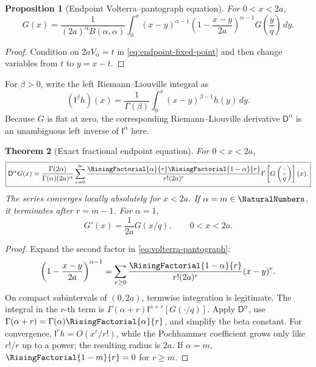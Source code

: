 \documentclass[11pt]{article}
\newtheorem{theorem}{Theorem}[section]
\newtheorem{proposition}[theorem]{Proposition}
\theoremstyle{definition}
\theoremstyle{remark}
\newcommand{\Iop}{\mathsf{I}}
\newcommand{\Dop}{\mathsf{D}}
\begin{document}
\begin{proposition}[Endpoint Volterra--pantograph equation]
\label{prop:volterra}
For \(0<x<2a\),
\begin{equation}
 G(x)=\frac1{(2a)^\alpha B(\alpha,\alpha)}
 \int_0^x(x-y)^{\alpha-1}
 \left(1-\frac{x-y}{2a}\right)^{\alpha-1}
 G\left(\frac yq\right)\,dy.
 \label{eq:volterra-pantograph}
\end{equation}
\end{proposition}

\begin{proof}
Condition on \(2aV_\alpha=t\) in \eqref{eq:endpoint-fixed-point} and then
change variables from \(t\) to \(y=x-t\).
\end{proof}

For \(\beta>0\), write the left Riemann--Liouville integral as
\begin{equation}
 (\Iop^\beta h)(x)
 =\frac1{\Gamma(\beta)}\int_0^x(x-y)^{\beta-1}h(y)\,dy.
 \label{eq:RL-integral}
\end{equation}
Because \(G\) is flat at zero, the corresponding Riemann--Liouville derivative
\(\Dop^\alpha\) is an unambiguous left inverse of \(\Iop^\alpha\) here.

\begin{theorem}[Exact fractional endpoint equation]
\label{thm:fractional-pantograph}
For \(0<x<2a\),
\begin{equation}
\boxed{
 \Dop^\alpha G(x)
 =\frac{\Gamma(2\alpha)}{\Gamma(\alpha)(2a)^\alpha}
 \sum_{r=0}^{\infty}
 \frac{\RisingFactorial{\alpha}{r}\RisingFactorial{1-\alpha}{r}}
 {r!(2a)^r}
 \Iop^r\!\left[G\left(\frac{\cdot}{q}\right)\right](x).}
 \label{eq:fractional-endpoint-equation}
\end{equation}
The series converges locally absolutely for \(x<2a\).  If
\(\alpha=m\in\NaturalNumbers\), it terminates after \(r=m-1\).  For \(\alpha=1\),
\begin{equation}
 G'(x)=\frac1{2a}G(x/q),\qquad 0<x<2a.
 \label{eq:uniform-endpoint-G}
\end{equation}
\end{theorem}

\begin{proof}
Expand the second factor in \eqref{eq:volterra-pantograph}:
\[
 \left(1-\frac{x-y}{2a}\right)^{\alpha-1}
 =\sum_{r\ge0}\frac{\RisingFactorial{1-\alpha}{r}}{r!(2a)^r}(x-y)^r.
\]
On compact subintervals of \((0,2a)\), termwise integration is legitimate.
The integral in the \(r\)-th term is
\(\Gamma(\alpha+r)\Iop^{\alpha+r}[G(\cdot/q)]\).  Apply
\(\Dop^\alpha\), use
\(\Gamma(\alpha+r)=\Gamma(\alpha)\RisingFactorial{\alpha}{r}\), and simplify the beta
constant.  For convergence, \(\Iop^rh=O(x^r/r!)\), while the Pochhammer
coefficient grows only like \(r!/r\) up to a power; the resulting radius is
\(2a\).  If \(\alpha=m\), \(\RisingFactorial{1-m}{r}=0\) for \(r\ge m\).
\end{proof}
\end{document}
